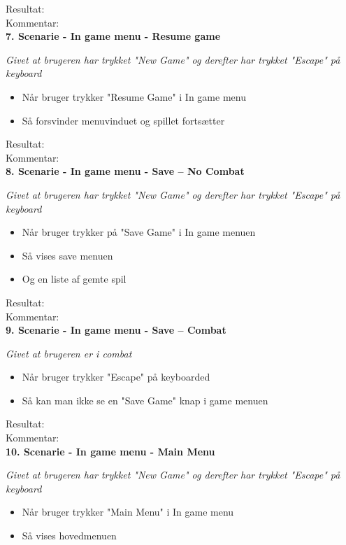 Resultat:\\
Kommentar:\\

\textbf{7. Scenarie - In game menu - Resume game}

\textit{Givet at brugeren har trykket "New Game" og derefter har trykket "Escape" på keyboard}

\begin{itemize}
  \item Når bruger trykker "Resume Game" i In game menu
  \item Så forsvinder menuvinduet og spillet fortsætter
\end{itemize}

Resultat:\\
Kommentar:\\

\textbf{8. Scenarie - In game menu - Save -- No Combat}

\textit{Givet at brugeren har trykket "New Game" og derefter har trykket "Escape" på keyboard}

\begin{itemize}
  \item Når bruger trykker på "Save Game" i In game menuen
  \item Så vises save menuen
  \item Og en liste af gemte spil
\end{itemize}

Resultat:\\
Kommentar:\\

\textbf{9. Scenarie - In game menu - Save -- Combat}

\textit{Givet at brugeren er i combat}

\begin{itemize}
  \item Når bruger trykker "Escape" på keyboarded
  \item Så kan man ikke se en "Save Game" knap i game menuen
\end{itemize}

Resultat:\\
Kommentar:\\

\textbf{10. Scenarie - In game menu - Main Menu}

\textit{Givet at brugeren har trykket "New Game" og derefter har trykket "Escape" på keyboard}

\begin{itemize}
  \item Når bruger trykker "Main Menu" i In game menu
  \item Så vises hovedmenuen
\end{itemize}

